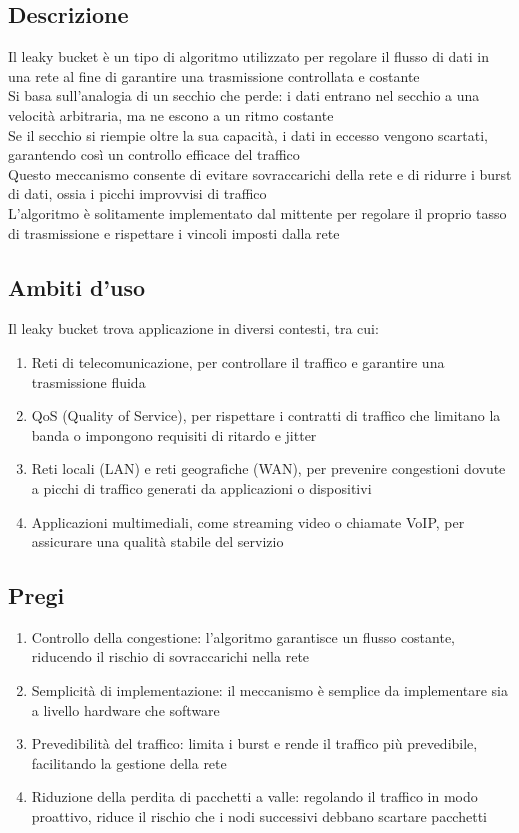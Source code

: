 \documentclass[10pt,oneside,a4paper]{article}
\begin{document}
\subsection{Descrizione}
Il leaky bucket è un tipo di algoritmo utilizzato per regolare il flusso di dati in una rete al fine di garantire una trasmissione controllata e costante\\
Si basa sull'analogia di un secchio che perde: i dati entrano nel secchio a una velocità arbitraria, ma ne escono a un ritmo costante\\
Se il secchio si riempie oltre la sua capacità, i dati in eccesso vengono scartati, garantendo così un controllo efficace del traffico\\
Questo meccanismo consente di evitare sovraccarichi della rete e di ridurre i burst di dati, ossia i picchi improvvisi di traffico\\
L'algoritmo è solitamente implementato dal mittente per regolare il proprio tasso di trasmissione e rispettare i vincoli imposti dalla rete
\subsection{Ambiti d'uso}
Il leaky bucket trova applicazione in diversi contesti, tra cui:
\begin{enumerate}
\item Reti di telecomunicazione, per controllare il traffico e garantire una trasmissione fluida
\item QoS (Quality of Service), per rispettare i contratti di traffico che limitano la banda o impongono requisiti di ritardo e jitter
\item Reti locali (LAN) e reti geografiche (WAN), per prevenire congestioni dovute a picchi di traffico generati da applicazioni o dispositivi
\item Applicazioni multimediali, come streaming video o chiamate VoIP, per assicurare una qualità stabile del servizio
\end{enumerate}
\subsection{Pregi}
\begin{enumerate}
    \item Controllo della congestione: l'algoritmo garantisce un flusso costante, riducendo il rischio di sovraccarichi nella rete
    \item Semplicità di implementazione: il meccanismo è semplice da implementare sia a livello hardware che software
    \item Prevedibilità del traffico: limita i burst e rende il traffico più prevedibile, facilitando la gestione della rete
    \item Riduzione della perdita di pacchetti a valle: regolando il traffico in modo proattivo, riduce il rischio che i nodi successivi debbano scartare pacchetti
\end{enumerate}
\end{document}
